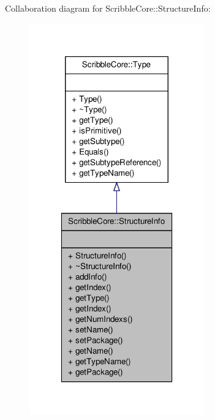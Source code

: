 Collaboration diagram for Scribble\-Core\-:\-:Structure\-Info\-:
\nopagebreak
\begin{figure}[H]
\begin{center}
\leavevmode
\includegraphics[width=214pt]{class_scribble_core_1_1_structure_info__coll__graph}
\end{center}
\end{figure}
